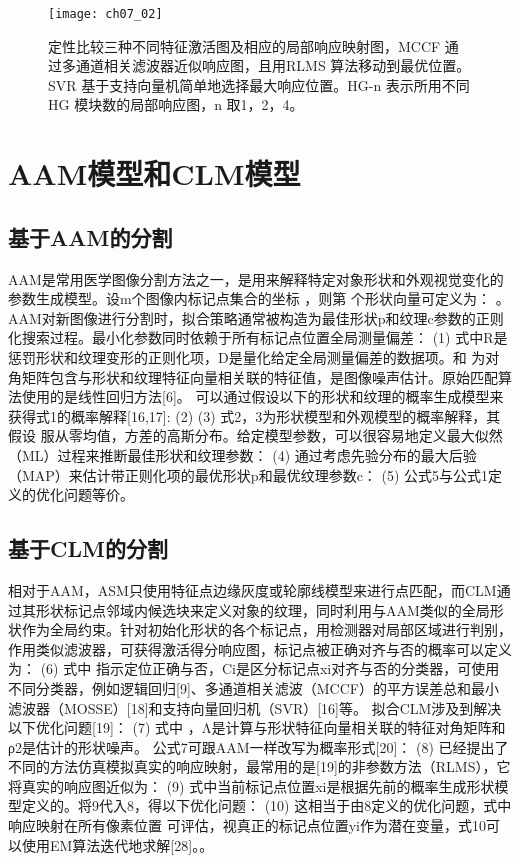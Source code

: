 \begin{figure}[!htbp]
    \centering
    \texttt{[image: ch07\_02]}
    \caption{定性比较三种不同特征激活图及相应的局部响应映射图，MCCF 通过多通道相关滤波器近似响应图，且用RLMS 算法移动到最优位置。SVR 基于支持向量机简单地选择最大响应位置。HG-n 表示所用不同HG 模块数的局部响应图，n 取1，2，4。}
    \label{fig:ch07_02}
    \end{figure}
    \section{AAM模型和CLM模型} 
    \subsection{基于AAM的分割} 
    AAM是常用医学图像分割方法之一，是用来解释特定对象形状和外观视觉变化的参数生成模型。设m个图像内标记点集合的坐标 ，则第 个形状向量可定义为： 。AAM对新图像进行分割时，拟合策略通常被构造为最佳形状p和纹理c参数的正则化搜索过程。最小化参数同时依赖于所有标记点位置全局测量偏差：
      (1)
    式中R是惩罚形状和纹理变形的正则化项，D是量化给定全局测量偏差的数据项。和 为对角矩阵包含与形状和纹理特征向量相关联的特征值，是图像噪声估计。原始匹配算法使用的是线性回归方法[6]。
    可以通过假设以下的形状和纹理的概率生成模型来获得式1的概率解释[16,17]:  
         (2)
              (3)
    式2，3为形状模型和外观模型的概率解释，其假设  服从零均值，方差的高斯分布。给定模型参数，可以很容易地定义最大似然（ML）过程来推断最佳形状和纹理参数：
                (4)
    通过考虑先验分布的最大后验（MAP）来估计带正则化项的最优形状p和最优纹理参数c：
      (5)
    公式5与公式1定义的优化问题等价。
    \subsection{基于CLM的分割}
    相对于AAM，ASM只使用特征点边缘灰度或轮廓线模型来进行点匹配，而CLM通过其形状标记点邻域内候选块来定义对象的纹理，同时利用与AAM类似的全局形状作为全局约束。针对初始化形状的各个标记点，用检测器对局部区域进行判别，作用类似滤波器，可获得激活得分响应图，标记点被正确对齐与否的概率可以定义为：
          (6)
    式中 指示定位正确与否，Ci是区分标记点xi对齐与否的分类器，可使用不同分类器，例如逻辑回归[9]、多通道相关滤波（MCCF）的平方误差总和最小滤波器（MOSSE）[18]和支持向量回归机（SVR）[16]等。
    拟合CLM涉及到解决以下优化问题[19]： 
          (7)
    式中 ，Λ是计算与形状特征向量相关联的特征对角矩阵和ρ2是估计的形状噪声。
    公式7可跟AAM一样改写为概率形式[20]：
          (8)
    已经提出了不同的方法仿真模拟真实的响应映射，最常用的是[19]的非参数方法（RLMS），它将真实的响应图近似为： 
              (9)
    式中当前标记点位置xi是根据先前的概率生成形状模型定义的。将9代入8，得以下优化问题：
          (10)
    这相当于由8定义的优化问题，式中响应映射在所有像素位置  可评估，视真正的标记点位置yi作为潜在变量，式10可以使用EM算法迭代地求解[28]。。
         
